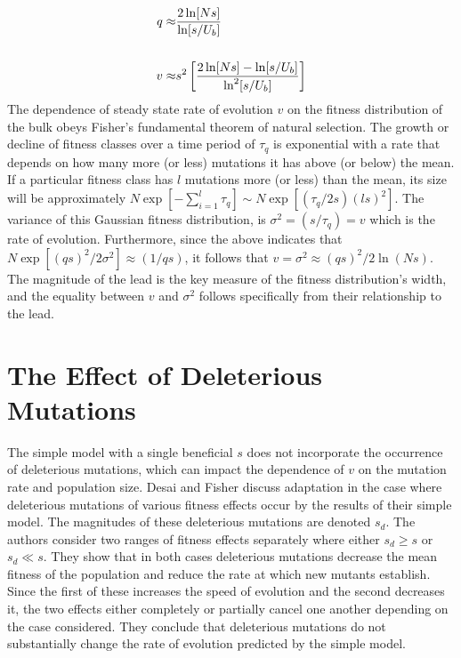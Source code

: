 \documentclass[12pt, one column]{article}
\begin{document}
\begin{equation}
\begin{aligned}
q \approx & {2\ln[Ns] \over \ln[s/U_b]} \\   
\\
v \approx & s^2 \left[{2\ln[Ns] - \ln[s/U_b] \over \ln^2[s/U_b]}\right]
\end{aligned}
\end{equation} 
The dependence of steady state rate of evolution $v$ on the fitness distribution of the bulk obeys Fisher's fundamental theorem of natural selection.  The growth or decline of fitness classes over a time period of $\tau_q$ is exponential with a rate that depends on how many more (or less) mutations it has above (or below) the mean.  If a particular fitness class has $l$ mutations  more (or less) than the mean, its size will be approximately $N \exp[-\sum_{i=1}^{l} \tau_q] \sim N \exp[(\tau_q/2s)(ls)^2]$.  The variance of this Gaussian fitness distribution, is $\sigma^2 = (s/\tau_q)=v$ which is the rate of evolution.  Furthermore, since the above indicates that $N \exp[(qs)^2/2\sigma^2]\approx (1/qs)$, it follows that $v=\sigma^2 \approx (qs)^2/2\ln(Ns)$.  The magnitude of the lead is the key measure of the fitness distribution's width, and the equality between $v$ and $\sigma^2$ follows specifically from their relationship to the lead.

\section*{The Effect of Deleterious Mutations}
The simple model with a single beneficial $s$ does not incorporate the occurrence of deleterious mutations, which can impact the dependence of $v$ on the mutation rate and population size.  Desai and Fisher discuss adaptation in the case where  deleterious mutations of various fitness effects occur by the results of their simple model.  The magnitudes of these deleterious mutations are denoted $s_d$.  The authors consider two ranges of fitness effects separately where either $s_d \geq s$ or $s_d \ll s$.  They show that in both cases deleterious mutations decrease the mean fitness of the population and reduce the rate at which new mutants establish.  Since the first of these increases the speed of evolution and the second decreases it, the two effects either completely or partially cancel one another depending on the case considered.  They conclude that deleterious mutations do not substantially change the rate of evolution predicted by the simple model.     
\end{document}
